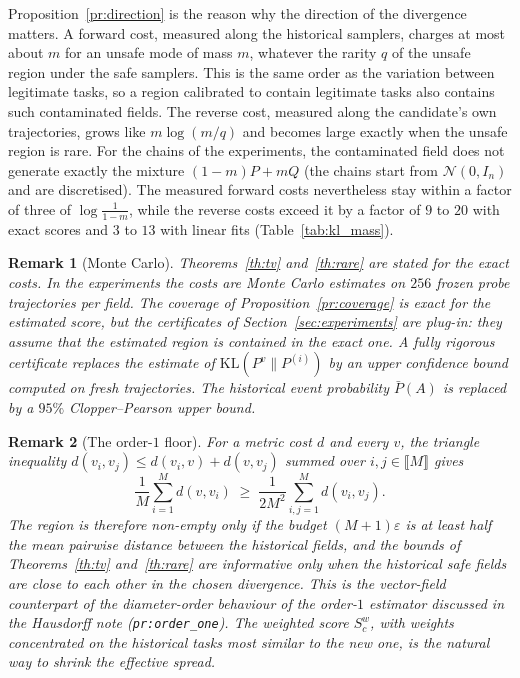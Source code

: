 \documentclass{article}
\newcommand{\Pv}[1]{P^{#1}}                         %
\newcommand{\Pbar}{\bar{P}}                         %
\newcommand{\KL}{\mathrm{KL}}
\theoremstyle{plain}
\newtheorem{remark}{Remark}
\begin{document}
Proposition~\ref{pr:direction} is the reason why the direction of the divergence matters. A
forward cost, measured along the historical samplers, charges at most about $m$ for an
unsafe mode of mass $m$, whatever the rarity $q$ of the unsafe region under the safe samplers.
This is the same order as the variation between legitimate tasks, so a region calibrated to
contain legitimate tasks also contains such contaminated fields. The reverse cost, measured
along the candidate's own trajectories, grows like $m\log(m/q)$ and becomes large exactly
when the unsafe region is rare. For the chains of the experiments, the contaminated
field does not generate exactly the mixture $(1-m)P+mQ$ (the chains start from
$\mathcal{N}(0,I_n)$ and are discretised). The measured forward costs nevertheless stay
within a factor of three of $\log\frac1{1-m}$, while the reverse costs exceed it by a factor
of $9$ to $20$ with exact scores and $3$ to $13$ with linear fits (Table~\ref{tab:kl_mass}).

\begin{remark}[Monte Carlo]\label{rem:mc}
Theorems~\ref{th:tv} and~\ref{th:rare} are stated for the exact costs. In the experiments the
costs are Monte Carlo estimates on $256$ frozen probe trajectories per field. The coverage of
Proposition~\ref{pr:coverage} is exact for the estimated score, but the certificates of
Section~\ref{sec:experiments} are \emph{plug-in}: they assume that the estimated region is
contained in the exact one. A fully rigorous certificate replaces the estimate of
$\KL(\Pv{v}\|P^{(i)})$ by an upper confidence bound computed on fresh trajectories. The
historical event probability $\Pbar(A)$ is replaced by a $95\%$ Clopper--Pearson upper bound.
\end{remark}

\begin{remark}[The order-$1$ floor]\label{rem:floor}
For a metric cost $d$ and every $v$, the triangle inequality
$d(v_i,v_j)\leq d(v_i,v)+d(v,v_j)$ summed over $i,j\in\llbracket M\rrbracket$ gives
\[
  \frac1M\sum_{i=1}^Md(v,v_i)\;\geq\;\frac{1}{2M^2}\sum_{i,j=1}^Md(v_i,v_j).
\]
The region is therefore non-empty only if the budget $(M+1)\varepsilon$ is at least half the
mean pairwise distance between the historical fields, and the bounds of
Theorems~\ref{th:tv} and~\ref{th:rare} are informative only when the historical safe fields are
close to each other in the chosen divergence. This is the vector-field counterpart of the
diameter-order behaviour of the order-$1$ estimator discussed in the Hausdorff note
(\texttt{pr:order\_one}). The weighted score $S^w_c$, with weights concentrated on the
historical tasks most similar to the new one, is the natural way to shrink the effective
spread.
\end{remark}
\end{document}
